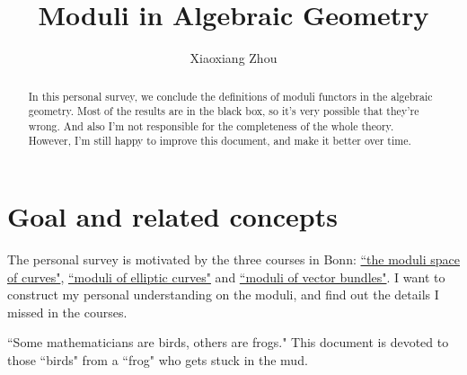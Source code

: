 \documentclass[reqno,11pt]{amsart}
\numberwithin{equation}{section}
\theoremstyle{plain}
\theoremstyle{plain}
\numberwithin{equation}{section}
\theoremstyle{remark}
\begin{document}
\date{}

\title
{Moduli in Algebraic Geometry}


\author{Xiaoxiang Zhou}
\address{School of Mathematical Sciences\\
University of Bonn\\
Bonn, 53115\\ Germany\\} 





\begin{abstract}
In this personal survey, we conclude the definitions of moduli functors in the algebraic geometry. Most of the results are in the black box, so it's very possible that they're wrong. And also I'm not responsible for the completeness of the whole theory. However, I'm still happy to improve this document, and make it better over time.
\end{abstract}

\setcounter{tocdepth}{1}
\maketitle
\tableofcontents
\section{Goal and related concepts}
The personal survey is motivated by the three courses in Bonn: \href{https://johannesschmitt.gitlab.io/moduli_of_curves}{``the moduli space of curves"}, \href{https://www.math.uni-bonn.de/people/mihatsch/21u22\%20WS/moduli/}{``moduli of elliptic curves"} and \href{https://www.math.uni-bonn.de/people/ydutta/v5a4}{``moduli of vector bundles"}. I want to construct my personal understanding on the moduli, and find out the details I missed in the courses. 

``Some mathematicians are birds, others
are frogs." This document is devoted to those ``birds" from a ``frog" who gets stuck in the mud. 
\end{document}
